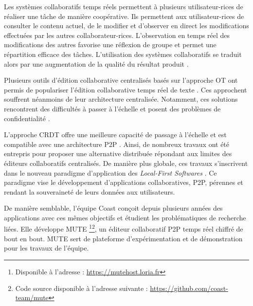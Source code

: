 Les systèmes collaboratifs temps réels permettent à plusieurs utilisateur-rices de réaliser une tâche de manière coopérative.
Ils permettent aux utilisateur-rices de consulter le contenu actuel, de le modifier et d'observer en direct les modifications effectuées par les autres collaborateur-rices.
L'observation en temps réel des modifications des autres favorise une réflexion de groupe et permet une répartition efficace des tâches.
L'utilisation des systèmes collaboratifs se traduit alors par une augmentation de la qualité du résultat produit \cite{2004-empirical-study-collaborative-writing, 2005-internet-encyclopaedias-head-to-head}.

Plusieurs outils d'édition collaborative centralisés basés sur l'approche \ac{OT} \cite{1989-grove-ellis-gibbs} ont permis de populariser l'édition collaborative temps réel de texte \cite{gdocs, etherpad}.
Ces approchent souffrent néanmoins de leur architecture centralisée.
Notamment, ces solutions rencontrent des difficultés à passer à l'échelle \cite{2015-cope-delay-collaborative-note-taking-ignat, 2016-performance-collaborative-editors-dang-ignat} et posent des problèmes de confidentialité \cite{prism-washington-post, prism-guardian}.

L'approche \ac{CRDT} offre une meilleure capacité de passage à l'échelle et est compatible avec une architecture \ac{P2P} \cite{2011-evaluation-crdts-ahmed-nacer}.
Ainsi, de nombreux travaux \cite{Nedelec2016CRATE, peerpad, serenity-notes} ont été entrepris pour proposer une alternative distribuée répondant aux limites des éditeurs collaboratifs centralisés.
De manière plus globale, ces travaux s'inscrivent dans le nouveau paradigme d'application des \emph{Local-First Softwares} \cite{localfirstsoftware2019, pushpin2020}.
Ce paradigme vise le développement d'applications collaboratives, \ac{P2P}, pérennes et rendant la souveraineté de leurs données aux utilisateurs.\\


De manière semblable, l'équipe Coast conçoit depuis plusieurs années des applications avec ces mêmes objectifs et étudient les problématiques de recherche liées.
Elle développe \acf{MUTE} \cite{MUTE2017}\footnote{Disponible à l'adresse : \url{https://mutehost.loria.fr}}\footnote{Code source disponible à l'adresse suivante : \url{https://github.com/coast-team/mute}}, un éditeur collaboratif \ac{P2P} temps réel chiffré de bout en bout.
\ac{MUTE} sert de plateforme d'expérimentation et de démonstration pour les travaux de l'équipe.

